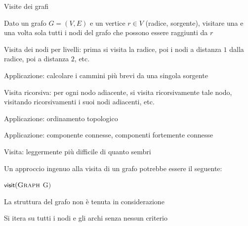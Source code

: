 \begin{frame}{Visite dei grafi}

\vspace{-9pt}
\begin{myboxtitle}
Dato un grafo $G=(V,E)$ e un vertice $r \in V$ (\alert{radice}, \alert{sorgente}), visitare una e una volta sola tutti i nodi del grafo che possono essere raggiunti da $r$
\end{myboxtitle}

\begin{overprint}
\begin{myboxtitle}
Visita dei nodi per livelli: prima si visita la radice, poi i nodi a distanza $1$ dalla radice, poi a distanza $2$, etc.
\BI
\item Applicazione: calcolare i cammini più brevi da una singola sorgente
\EI
\end{myboxtitle}

\begin{myboxtitle}
Visita ricorsiva: per ogni nodo adiacente, si visita ricorsivamente tale nodo, visitando ricorsivamenti i suoi nodi adiacenti, etc.

\BI
\item Applicazione: ordinamento topologico
\item Applicazione: componente connesse, componenti fortemente connesse
\EI
\end{myboxtitle}
\end{overprint}
\end{frame}


\begin{frame}{Visita: leggermente più difficile di quanto sembri}

Un approccio ingenuo alla visita di un grafo potrebbe essere il seguente:

\begin{Procedure}
\caption[A]{$\fontproc{visit}(\Graph\ $G$)$}
\end{Procedure}

\BIL
\item La struttura del grafo non è tenuta in considerazione
\item Si itera su tutti i nodi e gli archi senza nessun criterio
\EIL

\end{frame}


